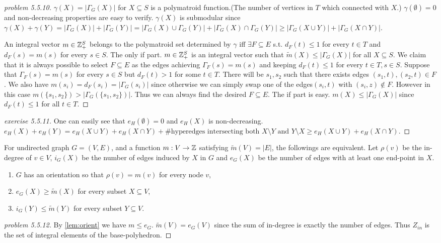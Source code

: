 \documentclass[12pt]{article}
\begin{document}
\begin{proof}[problem 5.5.10]
    $\gamma(X)=|\Gamma_G(X)|$ for $X\subseteq S$ is a polymatroid function.(The number of vertices in $T$ which connected with $X$.) $\gamma(\emptyset)=0$ and non-decreasing properties are easy to verify. $\gamma(X)$ is submodular since $\gamma(X)+\gamma(Y)=|\Gamma_G(X)|+|\Gamma_G(Y)|=|\Gamma_G(X)\cup \Gamma_G(Y)|+|\Gamma_G(X)\cap\Gamma_G(Y)|\geq |\Gamma_G(X\cup Y)|+|\Gamma_G(X\cap Y)|$.

    An integral vector $m\in \Z_+^S$ belongs to the polymatroid set determined by $\gamma$ iff $\exists F\subseteq E$ s.t. $d_F(t)\leq 1$ for every $t\in T$ and $d_F(s)=m(s)$ for every $s\in S$. 
    The only if part. $m\in \Z_+^S$ is an integral vector such that $\widetilde{m}(X)\leq |\Gamma_G(X)|$ for all $X\subseteq S$. We claim that it is always possible to select $F\subseteq E$ as the edges achieving $\Gamma_F(s)=m(s)$ and keeping $d_F(t)\leq 1$ for every $t\in T,s\in S$. Suppose that $\Gamma_F(s)=m(s)$ for every $s\in S$ but $d_F(t)> 1$ for some $t\in T$. There will be $s_1,s_2$ such that there exists edges $(s_1,t),(s_2,t)\in F$. We also have $m(s_i)=d_F(s_i)=|\Gamma_G(s_i)|$ since otherwise we can simply swap one of the edges$(s_i,t)$ with $(s_i,z)\notin F$. However in this case $m(\{s_1,s_2\})>|\Gamma_G(\{s_1,s_2\})|$. Thus we can always find the desired $F\subseteq E$.
    The if part is easy. $m(X)\leq |\Gamma_G(X)|$ since $d_F(t)\leq 1$ for all $t\in T$.
\end{proof}

\begin{proof}[exercise 5.5.11]
    One can easily see that $e_H(\emptyset)=0$ and $e_H(X)$ is non-decreasing.
$e_H(X)+e_H(Y)=e_H(X\cup Y)+e_H(X\cap Y)+\text{\# hyperedges intersecting both $X\setminus Y$ and $Y\setminus X$} \geq e_H(X\cup Y)+e_H(X\cap Y)$.
\end{proof}

\begin{theorem}\label{lem:orient}
    For undirected graph $G=(V,E)$, and a function $m:V\to \Z$ satisfying $\widetilde{m}(V)=|E|$, the followings are equivalent. Let $\rho(v)$ be the in-degree of $v\in V$, $i_G(X)$ be the number of edges induced by $X$ in $G$ and $e_G(X)$ be the number of edges with at least one end-point in $X$.
    \begin{enumerate}
        \item $G$ has an orientation so that $\rho(v)=m(v)$ for every node $v$,
        \item $e_G(X)\geq \widetilde{m}(X)$ for every subset $X\subseteq V$,
        \item $i_G(Y)\leq \widetilde{m}(Y)$ for every subset $Y\subseteq V$.
    \end{enumerate}
\end{theorem}
\begin{proof}[problem 5.5.12]
    By \autoref{lem:orient} we have $m\leq e_G$. $\widetilde{m}(V)=e_G(V)$ since the sum of in-degree is exactly the number of edges. Thus $Z_{in}$ is the set of integral elements of the base-polyhedron.
\end{proof}
\end{document}

